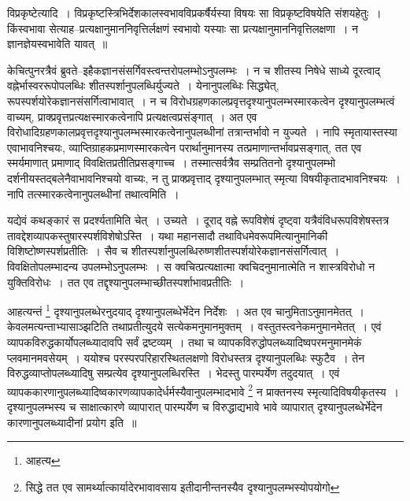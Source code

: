 \documentclass[article,12pt,a4paper]{memoir}
\begin{document}
	  \endgroup
	 

	  \pstart विप्रकृष्टेत्यादि । विप्रकृष्टस्त्रिभिर्देशकालस्वभावविप्रकर्षैर्यस्या विषयः सा विप्रकृष्टविषयेति संशयहेतुः । किंस्वभावा सेत्याह--प्रत्यक्षानुमाननिवृत्तिर्लक्षणं स्वभावो यस्याः सा प्रत्यक्षानुमाननिवृत्तिलक्षणा । न ज्ञानज्ञेयस्वभावेति यावत् ॥
	\pend
      
	  \endgroup
	

	  \pstart केचित्पुनरत्रैवं ब्रुवते--इहैकज्ञानसंसर्गिवस्त्वन्तरोपलम्भोऽनुपलम्भः । न च शीतस्य निषेधे साध्ये दूरत्वाद् वह्नेर्भास्वररूपोपलब्धिः शीतस्पर्शानुपलब्धिर्युज्यते । येनानुपलब्धिः सिद्ध्येत्, रूपस्पर्शयोरेकज्ञानसंसर्गित्वाभावात् । \leavevmode{} न च विरोधग्रहणकालप्रवृत्तदृश्यानुपलम्भस्मारकत्वेन दृश्यानुपलम्भत्वं वाच्यम्, प्राक्प्रवृत्तप्रत्यक्षस्मारकत्वेनापि प्रत्यक्षत्वप्रसंङ्गात् । अत एव विरोधादिग्रहणकालप्रवृत्तदृश्यानुपलम्भस्मारकत्वेनानुपलब्धीनां तत्रान्तर्भावो न युज्यते । नापि स्मृतायास्तस्या एवाभावनिश्चयः, व्याप्तिग्राहकप्रमाणस्मारकत्वेन परार्थानुमानस्य तत्प्रमाणान्तर्भावप्रसङ्गात्, तत एव स्मर्यमाणात् प्रमाणाद् विवक्षितप्रतीतिप्रसङ्गाच्च । तस्मात्सर्वत्रैव सम्प्रतितनो दृश्यानुपलम्भो दर्शनीयस्तद्बलेनैवाभावनिश्चयो वाच्यः, न तु प्राक्प्रवृत्ताद् दृश्यानुपलम्भात् स्मृत्या विषयीकृतादभावनिश्चयः । नापि तत्स्मारकत्वेनानुपलब्धीनां तथात्वमिति ।
	\pend
      

	  \pstart यद्येवं कथङ्कारं स प्रदर्श्यतामिति चेत् । उच्यते । दूराद् वह्ने रूपविशेषं दृष्ट्वा यत्रैवंविधरूपविशेषस्तत्र तावद्देशव्यापकस्तुषारस्पर्शविशेषोऽस्ति । यथा महानसादौ तथाविधमेवरूपमित्यानुमानिकी विशिष्टोष्णस्पर्शप्रतीतिः । सैव च शीतस्पर्शानुपलब्धिरुष्णशीतस्पर्शयोरेकज्ञानसंसर्गित्वात् । विवक्षितोपलम्भादन्य उपलम्भोऽनुपलम्भः । स क्वचित्प्रत्यक्षात्मा क्वचिदनुमानात्मेति न शास्त्रविरोधो न युक्तिविरोधः । तत एव तद्दृश्यानुपलम्भाच्छीतस्पर्शाभावप्रतीतिः ।
	\pend
      

	  \pstart आहत्यन्तं \footnote{आहत्य} दृश्यानुपलब्धेरनुदयाद् दृश्यानुपलब्धेर्भेदेन निर्देशः । अत एव चानुमिताऽनुमानमेतत् । केवलमत्यन्ताभ्यासाञ्झटिति तथाप्रतीत्युदये सत्येकमनुमानमुक्तम् । वस्तुतस्त्वनेकमनुमानमेतत् । एवं व्यापकविरुद्धकार्योपलब्ध्यादावपि सर्वं द्रष्टव्यम् । तथा च व्यापकविरुद्धोपलब्ध्यादिष्वपरमनुमानमेकं प्लवमानमवसेयम् । ययोश्च परस्परपरिहारस्थितलक्षणो विरोधस्तत्र दृश्यानुपलब्धिः स्फुटैव । तेन विरुद्धव्याप्तोपलब्ध्यादिषु सम्प्रत्येव दृश्यानुपलब्धिरस्ति । भेदस्तु पारम्पर्येण तदुदयात् । एवं व्यापककारणानुपलब्ध्यादिष्वकारणव्यापकादेर्धर्मस्यैवानुपलम्भादभावे \footnote{सिद्धे तत एव सामर्थ्यात्कार्यादेरभावावसाय इतीदानीन्तनस्यैव दृश्यानुपलम्भस्योपयोगो} न प्राक्तनस्य स्मृत्यादिविषयीकृतस्य । दृश्यानुपलम्भस्य च साक्षात्कारणे व्यापारात् पारम्पर्येण च विरुद्धाद्यभावे भावे व्यापारात् दृश्यानुपलब्धेर्भेदेन कारणानुपलब्ध्यादीनां प्रयोग इति ॥
	\pend
      \leavevmode{}
	  \bigskip
	  \begingroup
	
\end{document}
